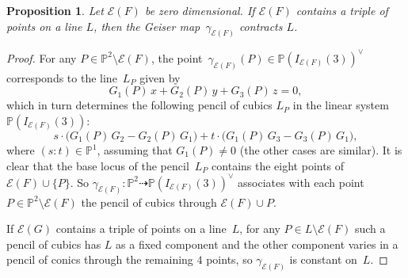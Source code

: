 \documentclass{amsart}
\theoremstyle{plain}
\newtheorem{prop}[lemma]{Proposition}
\theoremstyle{definition}
\newcommand{\p}{\mathbb{P}}
\newcommand{\Eig}[1]{\mathcal{E}\!\left( {#1} \right)}
\begin{document}
\begin{prop}
\label{prop:allineati_contrae}
Let $\Eig{F}$ be zero dimensional.
If $\Eig{F}$ contains a triple of points on a line $L$, then the Geiser map~$\gamma_{\Eig{F}}$ contracts $L$.
\end{prop}

\begin{proof}
%
For any $P \in \p^2 \setminus \Eig{F}$, the point~$\gamma_{\Eig{F}} (P)\in \p (I_{\Eig{F}}(3))^{\vee}$ corresponds to the line~$L_P$ given by
\[
  G_1 (P) \, x + G_2(P) \, y + G_3(P) \, z = 0,
\]
%
which in turn determines the following
pencil of cubics $L_P$ in the linear system $\p (I_{\Eig{F}}(3))$:
%
\[
  s \cdot \bigl( G_1(P) \, G_2 - G_2(P) \, G_1 \bigr) + t \cdot \bigl( G_1(P) \, G_3 - G_3(P) \, G_1 \bigr),
\]
%
where $(s: t) \in \p^1$, assuming that $G_1(P) \neq 0$ (the other cases are similar).
It is clear that the base locus of the pencil~$L_P$ contains the eight points of~$\Eig{F} \cup \{P\}$.
So $\gamma_{\Eig{F}} \colon \p^2 \dasharrow \p (I_{\Eig{F}}(3))^\vee$
associates with each point $P \in \p^2 \setminus \Eig{F}$ the pencil of cubics through $\Eig{F} \cup P$.

If $\Eig{G}$ contains a triple of points on a line~$L$, for any $P \in L \setminus \Eig{F}$ such a pencil of cubics has $L$ as a fixed component and the other component varies in a pencil of conics through the remaining $4$ points, so $\gamma_{\Eig{F}}$ is constant on~$L$.
\end{proof}


\end{document}
